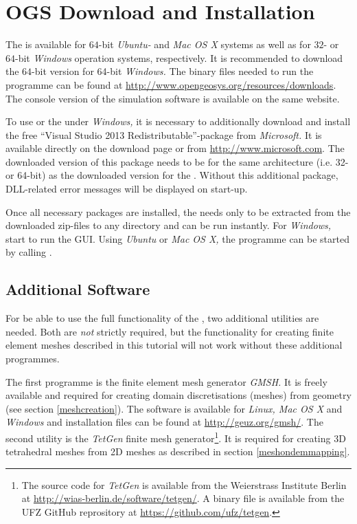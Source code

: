 \section{OGS Download and Installation}

The \ogsde{} is available for $64$-bit \emph{Ubuntu-} and \emph{Mac OS X} systems as well as for $32$- or $64$-bit \emph{Windows} operation systems, respectively. It is recommended to download the $64$-bit version for 64-bit \emph{Windows.} The binary files needed to run the programme can be found at \url{http://www.opengeosys.org/resources/downloads}. The console version of the \ogs{} simulation software is available on the same website.

To use \ogs{} or the \de{} under \emph{Windows,} it is necessary to additionally download and install the free ``Visual Studio 2013 Redistributable''-package from \emph{Microsoft.} It is available directly on the \ogs{} download page or from \url{http://www.microsoft.com}. The downloaded version of this package needs to be for the same architecture (i.e. 32- or 64-bit) as the downloaded version for the \de{}. Without this additional package, DLL-related error messages will be displayed on start-up.

Once all necessary packages are installed, the \de{} needs only to be extracted from the downloaded zip-files to any directory and can be run instantly. For \emph{Windows,} start  to run the GUI. Using \emph{Ubuntu} or \emph{Mac OS X,} the programme can be started by calling .

\subsection*{Additional Software}

For be able to use the full functionality of the \de{}, two additional utilities are needed. Both are \emph{not} strictly required, but the functionality for creating finite element meshes described in this tutorial will not work without these additional programmes.

The first programme is the finite element mesh generator \emph{GMSH.} It is freely available and required for creating domain discretisations (meshes) from geometry (see section \ref{meshcreation}). The software is available for \emph{Linux, Mac OS X} and \emph{Windows} and installation files can be found at \url{http://geuz.org/gmsh/}. The second utility is the \emph{TetGen} finite mesh generator\footnote{The source code for \emph{TetGen} is available from the Weierstrass Institute Berlin at \url{http://wias-berlin.de/software/tetgen/}. A binary file is available from the UFZ GitHub reprository at \url{https://github.com/ufz/tetgen}.}. It is required for creating 3D tetrahedral meshes from 2D meshes as described in section \ref{meshondemmapping}.

